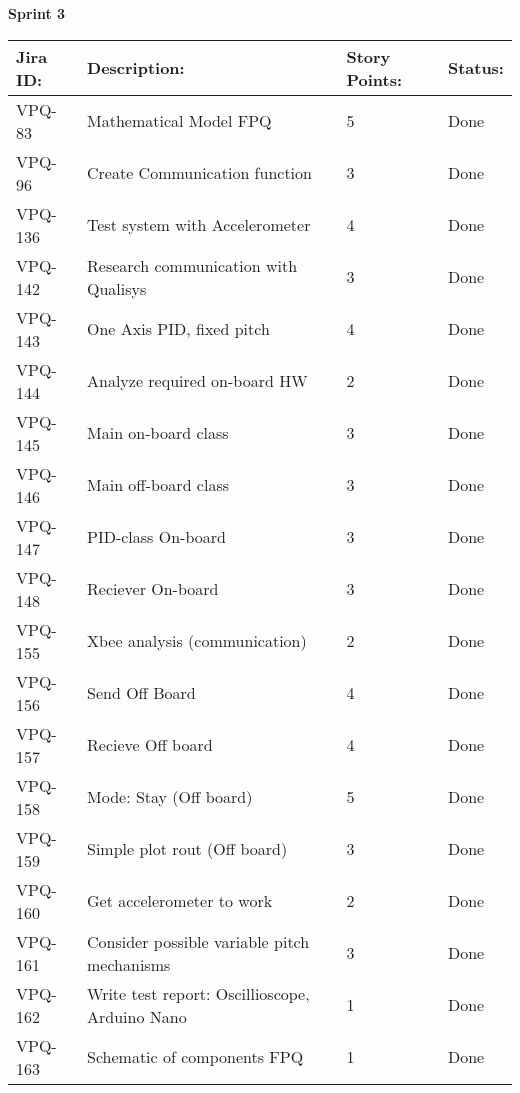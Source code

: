 \begin{table}[ht]
\centering\textbf{Sprint 3}
\begin{tabularx}{\linewidth}{|m{1.5cm} m{8.3cm} m{1.5cm} m{3.5cm}|}
\hline
    \rowcolor{cadetgrey} 
     \textbf{Jira ID:} & \textbf{Description:} & \textbf{Story Points:} & \textbf{Status: } \\ \hline
      VPQ-83 & Mathematical Model FPQ & 5\centering & Done  \\ 
\rowcolor{gainsboro} VPQ-96 &  Create Communication function & 3\centering & Done  \\
      VPQ-136 & Test system with Accelerometer & 4\centering & Done  \\
\rowcolor{gainsboro} VPQ-142 & Research communication with Qualisys & 3\centering & Done  \\
      VPQ-143 & One Axis PID, fixed pitch & 4\centering & Done  \\
\rowcolor{gainsboro} VPQ-144 &  Analyze required on-board HW & 2\centering & Done  \\
      VPQ-145 & Main on-board class & 3\centering & Done  \\
\rowcolor{gainsboro} VPQ-146 & Main off-board class & 3\centering & Done  \\    
      VPQ-147 & PID-class On-board & 3\centering & Done  \\
\rowcolor{gainsboro}  VPQ-148 & Reciever On-board & 3\centering & Done \\
      VPQ-155 & Xbee analysis (communication) & 2\centering & Done  \\
\rowcolor{gainsboro} VPQ-156 &  Send Off Board & 4\centering & Done  \\    
      VPQ-157 & Recieve Off board & 4\centering & Done  \\
\rowcolor{gainsboro}  VPQ-158 &  Mode: Stay (Off board) & 5\centering & Done  \\
      VPQ-159 & Simple plot rout (Off board) & 3\centering & Done  \\
\rowcolor{gainsboro} VPQ-160 & Get accelerometer to work & 2\centering & Done  \\    
      VPQ-161 & Consider possible variable pitch mechanisms & 3\centering & Done  \\
\rowcolor{gainsboro}  VPQ-162 & Write test report: Oscillioscope, Arduino Nano & 1\centering & Done  \\
      VPQ-163 & Schematic of components FPQ & 1\centering & Done  \\

\end{tabularx}
\end{table}
